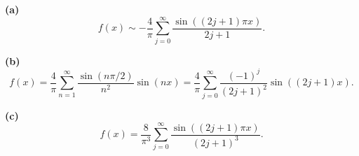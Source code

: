 \noindent\textbf{(a)} \[f(x)\sim-\frac4\pi\sum_{j=0}^{\infty}\frac{\sin((2j+1)\pi x)}{2j+1}.\]

\noindent\textbf{(b)} \[f(x)=\frac4\pi\sum_{n=1}^{\infty}\frac{\sin(n\pi/2)}{n^2}\sin(nx)
=\frac4\pi\sum_{j=0}^{\infty}\frac{(-1)^j}{(2j+1)^2}\sin((2j+1)x).\]

\noindent\textbf{(c)} \[f(x)=\frac8{\pi^3}\sum_{j=0}^{\infty}\frac{\sin((2j+1)\pi x)}{(2j+1)^3}.\]
